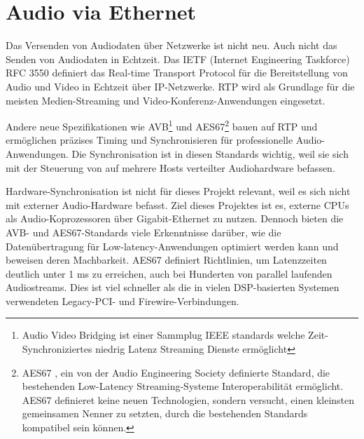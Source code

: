 \section{Audio via Ethernet}

Das Versenden von Audiodaten über Netzwerke ist nicht neu. Auch nicht das Senden von Audiodaten in Echtzeit. Das IETF (Internet Engineering Taskforce) RFC 3550 definiert das Real-time Transport Protocol für die Bereitstellung von Audio und Video in Echtzeit über IP-Netzwerke. RTP wird als Grundlage für die meisten Medien-Streaming und Video-Konferenz-Anwendungen eingesetzt.

Andere neue Spezifikationen wie AVB\footnote{Audio Video Bridging ist einer Sammplug IEEE standards welche Zeit-Synchroniziertes niedrig Latenz Streaming Dienste ermöglicht } und AES67\footnote{AES67 , ein von der Audio Engineering Society definierte Standard, die bestehenden Low-Latency Streaming-Systeme Interoperabilität ermöglicht. AES67 definieret keine neuen Technologien, sondern versucht, einen kleinsten gemeinsamen Nenner zu setzten, durch die bestehenden Standards kompatibel sein können. } bauen auf RTP und ermöglichen  präzises Timing und Synchronisieren für professionelle Audio-Anwendungen. Die Synchronisation ist in diesen Standards wichtig, weil sie sich mit der Steuerung von auf mehrere Hosts verteilter Audiohardware befassen.

Hardware-Synchronisation ist nicht für dieses Projekt relevant, weil es sich nicht mit externer Audio-Hardware befasst.  Ziel dieses Projektes ist es, externe CPUs als Audio-Koprozessoren über Gigabit-Ethernet zu nutzen.  Dennoch bieten die AVB- und AES67-Standards viele Erkenntnisse darüber, wie die Datenübertragung für Low-latency-Anwendungen optimiert werden kann und  beweisen deren Machbarkeit.  AES67 definiert Richtlinien, um Latenzzeiten deutlich unter 1 ms zu erreichen, auch bei Hunderten von parallel laufenden Audiostreams. Dies ist viel schneller als die in vielen DSP-basierten Systemen verwendeten Legacy-PCI- und Firewire-Verbindungen\cite{bouillot2009aes}.
